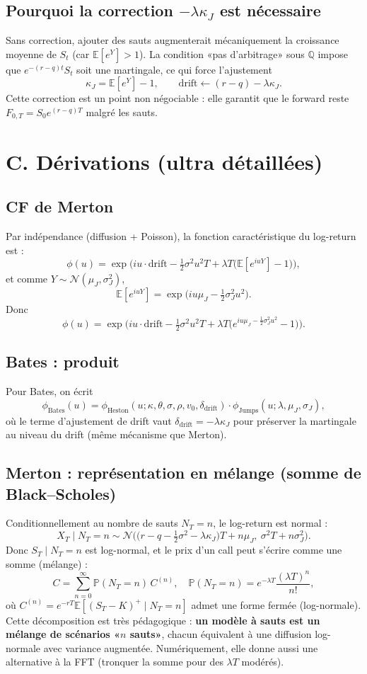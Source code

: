 \documentclass[11pt,a4paper]{report}
\theoremstyle{definition}
\theoremstyle{plain}
\theoremstyle{remark}
\newcommand{\E}{\mathbb{E}}
\newcommand{\Prob}{\mathbb{P}}
\newcommand{\1}{\mathbf{1}}
\newcommand{\Normal}{\mathcal{N}}
\newcommand{\Qmeas}{\mathbb{Q}}
\begin{document}
\subsection*{Pourquoi la correction $-\lambda\kappa_J$ est nécessaire}
Sans correction, ajouter des sauts augmenterait mécaniquement la croissance moyenne de $S_t$ (car $\E[e^Y]>1$).
La condition «pas d'arbitrage» sous $\Qmeas$ impose que $e^{-(r-q)t}S_t$ soit une martingale, ce qui force l'ajustement
\[
\kappa_J=\E[e^Y]-1,\qquad \text{drift}\gets (r-q)-\lambda\kappa_J.
\]
Cette correction est un point non négociable : elle garantit que le forward reste $F_{0,T}=S_0e^{(r-q)T}$ malgré les sauts.

\section{C. Dérivations (ultra détaillées)}
\subsection*{CF de Merton}
Par indépendance (diffusion + Poisson), la fonction caractéristique du log-return est :
\[
\phi(u)=\exp\Big(iu\cdot \text{drift} -\tfrac12\sigma^2u^2T + \lambda T\big(\E[e^{iuY}]-1\big)\Big),
\]
et comme $Y\sim\Normal(\mu_J,\sigma_J^2)$,
\[
\E[e^{iuY}] = \exp\Big(iu\mu_J - \tfrac12\sigma_J^2u^2\Big).
\]
Donc
\[
\phi(u)=\exp\Big(iu\cdot \text{drift} -\tfrac12\sigma^2u^2T + \lambda T\big(e^{iu\mu_J - \frac12\sigma_J^2u^2}-1\big)\Big).
\]

\subsection*{Bates : produit}
Pour Bates, on écrit
\[
\phi_{\text{Bates}}(u)=\phi_{\text{Heston}}(u;\kappa,\theta,\sigma,\rho,v_0,\delta_{\text{drift}})\cdot \phi_{\text{Jumps}}(u;\lambda,\mu_J,\sigma_J),
\]
où le terme d'ajustement de drift vaut $\delta_{\text{drift}}=-\lambda\kappa_J$ pour préserver la martingale au niveau du drift (même mécanisme que Merton).

\subsection*{Merton : représentation en mélange (somme de Black--Scholes)}
Conditionnellement au nombre de sauts $N_T=n$, le log-return est normal :
\[
X_T\mid N_T=n \sim \Normal\Big(\big(r-q-\tfrac12\sigma^2-\lambda\kappa_J\big)T+n\mu_J,\ \sigma^2T+n\sigma_J^2\Big).
\]
Donc $S_T\mid N_T=n$ est log-normal, et le prix d'un call peut s'écrire comme une somme (mélange) :
\[
C=\sum_{n=0}^{\infty}\Prob(N_T=n)\,C^{(n)},
\quad \Prob(N_T=n)=e^{-\lambda T}\frac{(\lambda T)^n}{n!},
\]
où $C^{(n)}=e^{-rT}\E[(S_T-K)^+\mid N_T=n]$ admet une forme fermée (log-normale).
Cette décomposition est très pédagogique : \textbf{un modèle à sauts est un mélange de scénarios «$n$ sauts»}, chacun équivalent à une diffusion log-normale avec variance augmentée.
Numériquement, elle donne aussi une alternative à la FFT (tronquer la somme pour des $\lambda T$ modérés).
\end{document}
